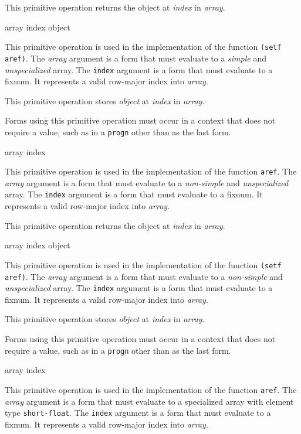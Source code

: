 This primitive operation returns the object at \textit{index} in
\textit{array}.

 {array index object}

This primitive operation is used in the implementation of the
\commonlisp{} function \texttt{(setf aref)}.  The \textit{array}
argument is a form that must evaluate to a \emph{simple} and
\emph{unspecialized} array.  The \texttt{index} argument is a form
that must evaluate to a fixnum.  It represents a valid row-major index
into \textit{array}.

This primitive operation stores \textit{object} at \textit{index} in
\textit{array}.

Forms using this primitive operation must occur in a context that does
not require a value, such as in a \texttt{progn} other than as the
last form.

 {array index}

This primitive operation is used in the implementation of the
\commonlisp{} function \texttt{aref}.  The \textit{array} argument is
a form that must evaluate to a \emph{non-simple} and
\emph{unspecialized} array.  The \texttt{index} argument is a form
that must evaluate to a fixnum.  It represents a valid row-major index
into \textit{array}.

This primitive operation returns the object at \textit{index} in
\textit{array}.

 {array index object}

This primitive operation is used in the implementation of the
\commonlisp{} function \texttt{(setf aref)}.  The \textit{array}
argument is a form that must evaluate to a \emph{non-simple} and
\emph{unspecialized} array.  The \texttt{index} argument is a form
that must evaluate to a fixnum.  It represents a valid row-major index
into \textit{array}.

This primitive operation stores \textit{object} at \textit{index} in
\textit{array}.

Forms using this primitive operation must occur in a context that does
not require a value, such as in a \texttt{progn} other than as the
last form.

 {array index}

This primitive operation is used in the implementation of the
\commonlisp{} function \texttt{aref}.  The \textit{array} argument is
a form that must evaluate to a specialized array with element type
\texttt{short-float}.  The \texttt{index} argument is a form that must
evaluate to a fixnum.  It represents a valid row-major index into
\textit{array}.

